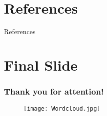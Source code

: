 \documentclass[pdflatex,compress,8pt,
	xcolor={dvipsnames,dvipsnames,svgnames,x11names,table},
	hyperref={colorlinks = true,breaklinks = true, urlcolor = NavyBlue, breaklinks = true}]{beamer}
\begin{document}
\section{References}
References
	\printbibliography[heading=none]



\section{Final Slide}
\begin{frame}\frametitle{Thank you for attention!}

\begin{figure}[H]
	\centering
		\texttt{[image: Wordcloud.jpg]}
\end{figure}		
\end{frame}
 
\end{document}
